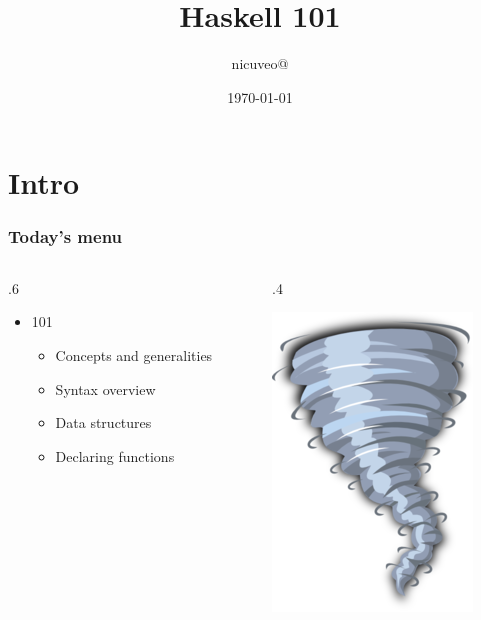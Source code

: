 \documentclass[17pt]{beamer}
\title{Haskell 101}
\author{nicuveo@}
\date{\small\today}
\renewcommand{\(}[1]{\begin{columns}[#1]}
\renewcommand{\)}{\end{columns}}
\newcommand{\<}[1]{\begin{column}{#1}}
\renewcommand{\>}{\end{column}}
\begin{document}

\togglefalse{showpagenumber}
\begin{frame}[fragile]
  \titlepage
\end{frame}
\toggletrue{showpagenumber}
\setcounter{framenumber}{0}




\section{Intro}

\begin{frame}
  \frametitle{Today's menu}
  \({c}
  \<{.6\textwidth}
  \begin{center}
  \begin{itemize}
  \item 101
    \begin{itemize}
    \item Concepts and generalities
    \item Syntax overview
    \item Data structures
    \item Declaring functions
    \end{itemize}
  \end{itemize}
  \end{center}
  \>
  \<{.4\textwidth}
  \begin{center}
    \includegraphics[width=.5\textwidth]{img/whirlwind}
  \end{center}
  \>
  \)
\end{frame}
\end{document}
